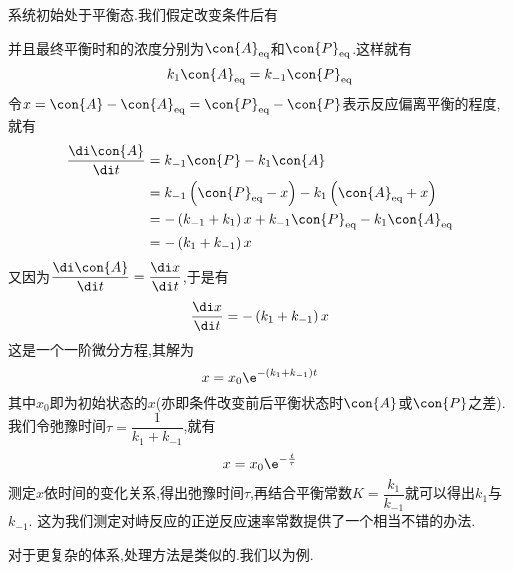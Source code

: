 \documentclass{ctexart}
\begin{document}
\begin{derivation}
    系统初始处于平衡态.我们假定改变条件后有
    \begin{tightcenter}
    \end{tightcenter}
    并且最终平衡时和的浓度分别为$\con{A}_{\text{eq}}$和$\con{P}_{\text{eq}}$.这样就有
    \[k_1\con{A}_{\text{eq}}=k_{-1}\con{P}_{\text{eq}}\]
    令$x=\con{A}-\con{A}_{\text{eq}}=\con{P}_{\text{eq}}-\con{P}$表示反应偏离平衡的程度,就有
    \[\begin{aligned}
        \dfrac{\di\con{A}}{\di t}
        &= k_{-1}\con{P}-k_1\con{A} \\
        &= k_{-1}\left(\con{P}_{\text{eq}}-x\right)-k_1\left(\con{A}_{\text{eq}}+x\right) \\
        &= -\left(k_{-1}+k_1\right)x+k_{-1}\con{P}_{\text{eq}}-k_1\con{A}_{\text{eq}} \\
        &= -\left(k_1+k_{-1}\right)x
    \end{aligned}\]
    又因为$\dfrac{\di\con{A}}{\di t}=\dfrac{\di x}{\di t}$,于是有
    \[\dfrac{\di x}{\di t}=-\left(k_1+k_{-1}\right)x\]
    这是一个一阶微分方程,其解为
    \[x=x_0\e^{-\left(k_1+k_{-1}\right)t}\]
    其中$x_0$即为初始状态的$x$(亦即条件改变前后平衡状态时$\con{A}$或$\con{P}$之差).我们令弛豫时间$\tau=\dfrac{1}{k_1+k_{-1}}$,就有
    \[x=x_0\e^{-\frac{t}{\tau}}\]
    测定$x$依时间的变化关系,得出弛豫时间$\tau$,再结合平衡常数$K=\dfrac{k_1}{k_{-1}}$就可以得出$k_1$与$k_{-1}$.%
    这为我们测定对峙反应的正逆反应速率常数提供了一个相当不错的办法.
\end{derivation}
对于更复杂的体系,处理方法是类似的.我们以为例.
\end{document}
